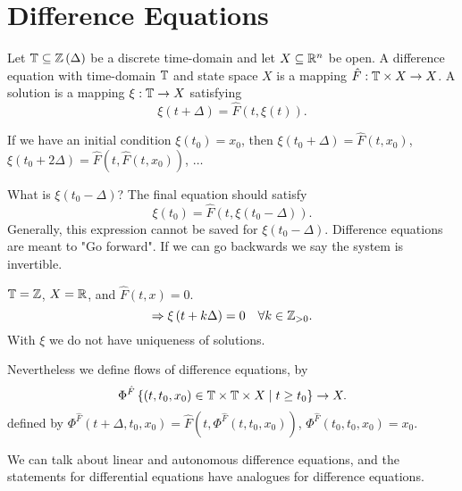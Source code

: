 \section{Difference Equations}

\begin{definition}
	Let $\mathbb{T} \subseteq \mathbb{Z}\left( \Delta\right) $ be a discrete time-domain and let $X \subseteq \mathbb{R}^{n}$ be open. A difference equation with time-domain $\mathbb{T}$ and state space $X$ is a mapping $\hat{F} : \mathbb{T} \times  X \to X$. A solution is a mapping $\xi : \mathbb{T}  \to  X $ satisfying
	\[
		\xi\left( t + \Delta \right)  = \hat{F} \left( t, \xi\left( t \right)  \right) 
	.\] 
\end{definition}

If we have an initial condition $\xi\left( t_0 \right)  = x_0$, then $\xi\left( t_0 + \Delta \right)  = \hat{F}\left( t, x_0 \right) $, $\xi\left( t_0 + 2 \Delta \right)  = \hat{F}\left( t, \hat{F}\left( t, x_0 \right)  \right)$, $\ldots$

What is $\xi\left( t_0 - \Delta \right) $? The final equation should satisfy 
 \[
	 \xi\left( t_0 \right)  = \hat{F}\left( t, \xi\left( t_0 - \Delta \right)  \right) 
.\] 
Generally, this expression cannot be saved for $\xi\left( t_0 - \Delta \right) $. Difference equations are meant to "Go forward". If we can go backwards we say the system is invertible. 

\begin{example}
	$\mathbb{T} = \mathbb{Z}$, $X = \mathbb{R}$, and $\hat{F}\left( t, x \right)  = 0$.
	\[
		\Rightarrow \xi\left( t + k\Delta \right)  = 0 \quad \forall  k \in \mathbb{Z}_{>0}
	.\] 
	With $\xi$ we do not have uniqueness of solutions. 

	Nevertheless we define flows of difference equations, by 
	\[
		\Phi^{\hat{F}}\left\{ \left( t, t_0, x_0 \right) \in  \mathbb{T} \times  \mathbb{T} \times  X  \mid  t \ge t_0 \right\} \to X
	.\] 
	defined by $\Phi^{\hat{F}}\left( t + \Delta, t_0, x_0 \right) =\hat{F}\left( t, \Phi^{\hat{F}}\left( t, t_0, x_0 \right)  \right) $, $\Phi^{\hat{F}}\left( t_0, t_0, x_0 \right) = x_0$.
	
	We can talk about linear and autonomous difference equations, and the statements for differential equations have analogues for difference equations. 
\end{example}
